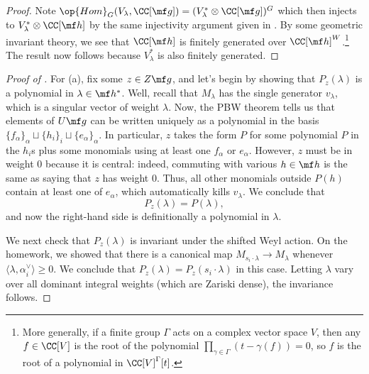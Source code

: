 \documentclass[../notes.tex]{subfiles}
\begin{document}
\begin{proof}
	Note $\op{Hom}_G(V_\lambda,\CC[\mf g])=(V_\lambda^*\otimes\CC[\mf g])^G$ which then injects to $V_\lambda^*\otimes\CC[\mf h]$ by the same injectivity argument given in . By some geometric invariant theory, we see that $\CC[\mf h]$ is finitely generated over $\CC[\mf h]^W$.\footnote{More generally, if a finite group $\Gamma$ acts on a complex vector space $V$, then any $f\in\CC[V]$ is the root of the polynomial $\prod_{\gamma\in\Gamma}(t-\gamma(f))=0$, so $f$ is the root of a polynomial in $\CC[V]^\Gamma[t]$.} The result now follows because $V_\lambda^*$ is also finitely generated.
\end{proof}
\begin{proof}[Proof of ]
	For (a), fix some $z\in Z\mf g$, and let's begin by showing that $P_z(\lambda)$ is a polynomial in $\lambda\in\mf h^*$. Well, recall that $M_\lambda$ has the single generator $v_\lambda$, which is a singular vector of weight $\lambda$. Now, the PBW theorem tells us that elements of $U\mf g$ can be written uniquely as a polynomial in the basis $\{f_\alpha\}_\alpha\sqcup\{h_i\}_i\sqcup\{e_\alpha\}_\alpha$. In particular, $z$ takes the form $P$ for some polynomial $P$ in the $h_i$s plus some monomials using at least one $f_\alpha$ or $e_\alpha$. However, $z$ must be in weight $0$ because it is central: indeed, commuting with various $h\in\mf h$ is the same as saying that $z$ has weight $0$. Thus, all other monomials outside $P(h)$ contain at least one of $e_\alpha$, which automatically kills $v_\lambda$. We conclude that
	\[P_z(\lambda)=P(\lambda),\]
	and now the right-hand side is definitionally a polynomial in $\lambda$.

	We next check that $P_z(\lambda)$ is invariant under the shifted Weyl action. On the homework, we showed that there is a canonical map $M_{s_i\cdot\lambda}\to M_\lambda$ whenever $\langle\lambda,\alpha_i^\lor\rangle\ge0$. We conclude that $P_z(\lambda)=P_z(s_i\cdot\lambda)$ in this case. Letting $\lambda$ vary over all dominant integral weights (which are Zariski dense), the invariance follows.


\end{proof}
\end{document}
